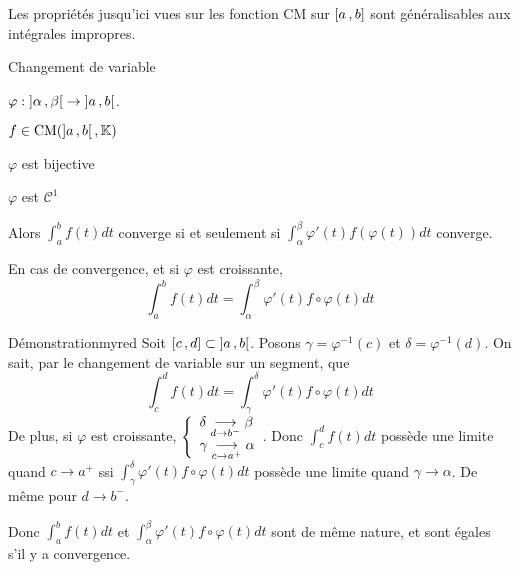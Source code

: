     Les propriétés jusqu’ici vues sur les fonction CM sur $\left[ a \, , b \right]$ sont généralisables aux intégrales impropres.

    \begin{theo}{Changement de variable}{}
        \begin{soient}
            \item $\varphi : \left] \alpha \, , \beta \right[ \to \left] a \, , b \right[$. 
            \item $f \in \operatorname{CM}(\left] a \, , b \right[, \mathbb{K})$
        \end{soient}
        \begin{suppose}
            \item $\varphi$ est bijective
            \item $\varphi$ est $\mathcal{C}^1$
        \end{suppose}
        Alors $\int_{a}^{b} f(t)dt$ converge si et seulement si $\int_{\alpha}^{\beta} \varphi'(t) f\left(\varphi(t)\right)dt$ converge.

        En cas de convergence, et si $\varphi$ est croissante,
        \[ \int_{a}^{b} f(t)dt = \int_{\alpha}^{\beta} \varphi'(t) f \circ \varphi(t)dt \]
    \end{theo}

    \begin{demo}{Démonstration}{myred}
        Soit $\left[ c \, , d \right] \subset \left] a \, , b \right[$. Posons $\gamma = \varphi^{-1}(c)$ et $\delta = \varphi^{-1}(d)$. On sait, par le changement de variable sur un segment, que
        \[ \int_{c}^{d} f(t)dt = \int_{\gamma}^{\delta} \varphi'(t) f \circ \varphi(t)dt \]   
        De plus, si $\varphi$ est croissante, $\et{\delta \limi{d}{b^-} \beta}{\gamma \limi{c}{a^+} \alpha}$. Donc $\int_{c}^{d} f(t)dt$ possède une limite quand $c \to a^+$ ssi $\int_{\gamma}^{\delta} \varphi'(t) f \circ \varphi(t) dt$ possède une limite quand $\gamma \to \alpha$. De même pour $d \to b^-$.
        
        Donc $\int_{a}^{b} f(t)dt$ et $\int_{\alpha}^{\beta} \varphi'(t) f \circ \varphi(t)dt$ sont de même nature, et sont égales s’il y a convergence.
    \end{demo}


